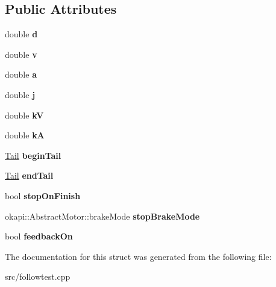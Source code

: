 \subsection*{Public Attributes}
\begin{DoxyCompactItemize}
\item 
\mbox{\label{structTrial_aa03ccfb291ed9cc2b7078ae7e92d6891}} 
double {\bfseries d}
\item 
\mbox{\label{structTrial_aebab47ba1a26683037a70407c1537a02}} 
double {\bfseries v}
\item 
\mbox{\label{structTrial_a41622542930b88ee64929407e155e5a6}} 
double {\bfseries a}
\item 
\mbox{\label{structTrial_ab758b9fffe8a44d35ebc38212d973172}} 
double {\bfseries j}
\item 
\mbox{\label{structTrial_a663812b290cd722ad79bab966a9157de}} 
double {\bfseries kV}
\item 
\mbox{\label{structTrial_a934b140a8aba892d5839afbf8689aa34}} 
double {\bfseries kA}
\item 
\mbox{\label{structTrial_a00912819027ccfa7755f4377ffcc2998}} 
\hyperlink{structTail}{Tail} {\bfseries begin\+Tail}
\item 
\mbox{\label{structTrial_a853567c8bf6d6459ae18ec56d311a71b}} 
\hyperlink{structTail}{Tail} {\bfseries end\+Tail}
\item 
\mbox{\label{structTrial_aacdc7ad201ec133e409338ff35e050e4}} 
bool {\bfseries stop\+On\+Finish}
\item 
\mbox{\label{structTrial_aed31bb634a7e800e1b86e1039400da75}} 
okapi\+::\+Abstract\+Motor\+::brake\+Mode {\bfseries stop\+Brake\+Mode}
\item 
\mbox{\label{structTrial_a7c2901078783e3e51907100952730e7d}} 
bool {\bfseries feedback\+On}
\end{DoxyCompactItemize}


The documentation for this struct was generated from the following file\+:\begin{DoxyCompactItemize}
\item 
src/followtest.\+cpp\end{DoxyCompactItemize}
